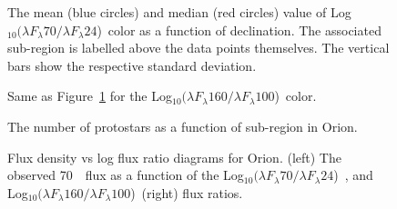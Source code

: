 \documentclass[manuscript]{aastex61}
\newcommand{\clra}{Log$_{10}(\lambda F_\lambda70/\lambda F_\lambda24$)}
\newcommand{\clrb}{Log$_{10}(\lambda F_\lambda160/\lambda F_\lambda100$)}
\begin{document}
\clearpage

%
%
%

\begin{figure}[ht]
\centering
{}
\caption{The mean (blue circles) and median (red circles) value of \clra\ color as a function of declination.  The associated sub-region is labelled above the data points themselves.  The vertical bars show the respective standard deviation.  \label{fig:clr1_v_dec}}
\end{figure}

\clearpage

\begin{figure}[ht]
\centering
{}
\caption{Same as Figure~\ref{fig:clr1_v_dec} for the \clrb\ color.  \label{fig:clr2_v_dec}}
\end{figure}

\clearpage

\begin{figure}[ht]
\centering
{}
\caption{The number of protostars as a function of sub-region in Orion.\label{fig:num_v_dec}}
\end{figure}

\clearpage

\begin{figure}[ht]
\centering
{}
\caption{Flux density vs log flux ratio diagrams for Orion.  (left) The observed 70~\micron\ flux as a function of the \clra\ , and \clrb\ (right) flux ratios.\label{fig:clrflux}}
\end{figure}

\clearpage
\end{document}
